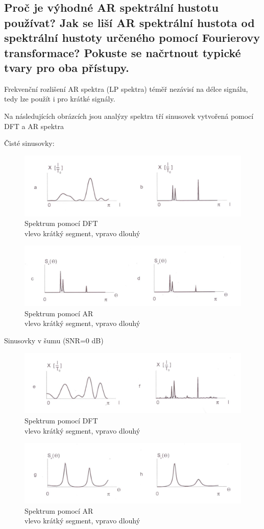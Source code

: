 \documentclass[a4paper,12pt]{article}   %
\begin{document}
\subsection{Proč je výhodné AR spektrální hustotu používat? Jak se liší AR spektrální hustota od spektrální hustoty určeného pomocí Fourierovy transformace? Pokuste se načrtnout typické tvary pro oba přístupy.}
Frekvenční rozlišení AR spektra (LP spektra) téměř nezávisí na délce signálu, tedy lze použít i pro krátké signály. 

Na následujících obrázcích jsou analýzy spektra tří sinusovek vytvořená pomocí DFT a AR spektra\\
{Čisté sinusovky:\\
\begin{figure}[!htb]
        \centering
        \includegraphics[width=.6\textwidth]{fig/DFT_clean.png}
        \caption*{Spektrum pomocí DFT\\ vlevo krátký segment, vpravo dlouhý}
\end{figure}
\begin{figure}[!htb]
        \centering
        \includegraphics[width=.6\textwidth]{fig/AR_clean.png}
        \caption*{Spektrum pomocí AR\\ vlevo krátký segment, vpravo dlouhý}
\end{figure}}
\FloatBarrier
Sinusovky v šumu (SNR=0 dB)\\
\begin{figure}[h!]
        \centering
        \includegraphics[width=.6\textwidth]{fig/DFT_noise.png}
        \caption*{Spektrum pomocí DFT\\ vlevo krátký segment, vpravo dlouhý}
\end{figure}
\begin{figure}[h!]
        \centering
        \includegraphics[width=.6\textwidth]{fig/AR_noise.png}
        \caption*{Spektrum pomocí AR\\ vlevo krátký segment, vpravo dlouhý}
\end{figure}
\FloatBarrier
\end{document}
